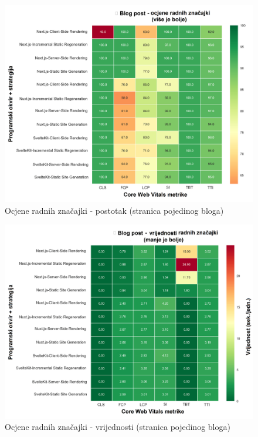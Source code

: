 \begin{figure}[H]
    \centering
    \includegraphics[width=\textwidth]{slike/rezultati/blog-post/blogPost_performance_scores.png}
    \caption{Ocjene radnih značajki - postotak (stranica pojedinog bloga) }
    \label{fig:testiranje-blog-post-postotak}
\end{figure}

\begin{figure}[H]
    \centering
    \includegraphics[width=\textwidth]{slike/rezultati/blog-post/blogPost_performance_values.png}
    \caption{Ocjene radnih značajki - vrijednosti (stranica pojedinog bloga) }
    \label{fig:testiranje-blog-post-vrijednosti}
\end{figure}

